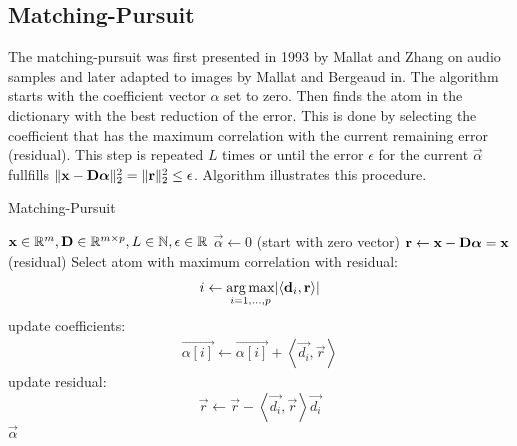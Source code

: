 \subsection{Matching-Pursuit}
\label{sec:mp}
The matching-pursuit was first presented in 1993 by Mallat and
Zhang\cite{Mallat1993} on audio samples and later adapted to images by Mallat
and Bergeaud in\cite{Mallat1995}.
The algorithm starts with the coefficient vector $\alpha$ set
to zero. Then finds the atom in the dictionary with the best reduction of the
error. This is done by selecting the coefficient that has the maximum
correlation with the current remaining error (residual). This step is repeated
$L$ times or until the error $\epsilon$
for the current $\vec{\alpha}$ fullfills $\lVert \boldsymbol{\mathrm{x}} - \boldsymbol{\mathrm{D}}\boldsymbol{\mathrm{\alpha}}
\rVert^{2}_{2} = \lVert \boldsymbol{\mathrm{r}} \rVert_2^2 \leq \epsilon$.
Algorithm  illustrates this procedure.
\begin{algorithm}[H]
\caption{Matching-Pursuit}
\label{alg:mp}
\begin{algorithmic}[1]
\REQUIRE $\boldsymbol{\mathrm{x}} \in \mathbb{R}^m, \boldsymbol{\mathrm{D}} \in \mathbb{R}^{m\times p}, L \in
\mathbb{N}, \epsilon \in \mathbb{R}$
\STATE $\vec{\alpha} \gets 0$ (start with zero vector)
\STATE $\boldsymbol{\mathrm{r}} \gets \boldsymbol{\mathrm{x}}-\boldsymbol{\mathrm{D}}\boldsymbol{\mathrm{\alpha}} = \boldsymbol{\mathrm{x}}$ (residual) 
\STATE Select atom with maximum correlation with residual: 
\begin{equation*}
i \gets \operatorname*{arg\,max}_{i=1,...,p} \lvert \left<\boldsymbol{\mathrm{d}}_i,\boldsymbol{\mathrm{r}}\right> \rvert
\end{equation*}
\STATE update coefficients: 
\begin{align}
\vec{\alpha[i]}  \gets \vec{\alpha[i]} + \left<\vec{d_i},\vec{r}\right>
\label{eq:mp_update}
\end{align}
\STATE update residual:
\begin{equation*}
 \vec{r} \gets \vec{r} - \left<\vec{d_i},\vec{r}\right>\vec{d_i}
\end{equation*}
\ENDWHILE
\RETURN $\vec{\alpha}$
\end{algorithmic}
\end{algorithm}

